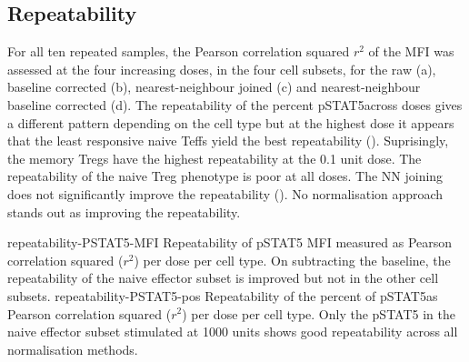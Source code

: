 %
\clearpage



\subsection{Repeatability} 
For all ten repeated samples, the Pearson correlation squared $r^2$ of the MFI was assessed at the four increasing doses, in the four cell subsets,
for the raw (a),
baseline corrected (b),
nearest-neighbour joined (c)
and nearest-neighbour baseline corrected (d).
The repeatability of the percent pSTAT5\positive across doses gives a different pattern depending on the cell type
but at the highest dose it appears that the least responsive naive \glspl{Teff} yield the best
repeatability ().
Suprisingly, the memory Tregs have the highest repeatability at the 0.1 unit dose.
The repeatability of the naive \gls{Treg} phenotype is poor at all doses.  
The NN joining does not significantly improve the repeatability ().
No normalisation approach stands out as improving the repeatability.

{repeatability-PSTAT5-MFI}
{
  Repeatability of pSTAT5 MFI measured as Pearson correlation squared ($r^2$) per dose per cell type.
}
{
  On subtracting the baseline, the repeatability of the naive effector subset is improved but not in the other cell subsets.
} 
{repeatability-PSTAT5-pos}
{
  Repeatability of the percent of pSTAT5\positive as Pearson correlation squared ($r^2$) per dose per cell type.
}
{
  Only the pSTAT5 in the naive effector subset stimulated at 1000 units shows good repeatability across all normalisation methods.
}

